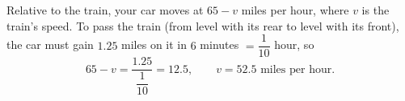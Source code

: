 Relative to the train, your car moves at $65-v$ miles per hour, where $v$ is the train's speed. To pass the train (from level with its rear to level with its front), the car must gain $1.25$ miles on it in $6$ minutes $=\dfrac{1}{10}$ hour, so
\[65-v=\dfrac{1.25}{\dfrac{1}{10}}=12.5,\qquad v=\boxed{52.5}\text{ miles per hour}.\]
